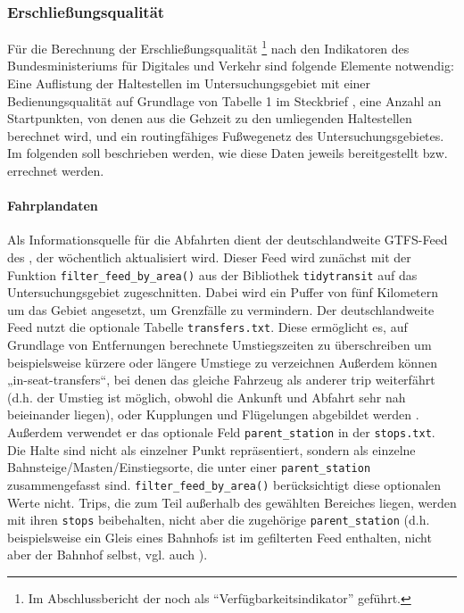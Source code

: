 \documentclass[11pt,a4paper]{scrartcl}
\begin{document}
    \subsubsection{Erschließungsqualität}
    Für die Berechnung der Erschließungsqualität \footnote{Im Abschlussbericht der \textcite{kcwgmbhMethodikUndEmpfehlungen2024} noch als \enquote{Verfügbarkeitsindikator} geführt.} nach den Indikatoren des Bundesministeriums für Digitales und Verkehr \parencite[25-27]{bmdvIndikatorenLeichtGemacht2025} sind folgende Elemente notwendig: Eine Auflistung der Haltestellen im Untersuchungsgebiet mit einer Bedienungsqualität auf Grundlage von Tabelle 1 im Steckbrief \parencite[27]{bmdvIndikatorenLeichtGemacht2025}, eine Anzahl an Startpunkten, von denen aus die Gehzeit zu den umliegenden Haltestellen berechnet wird, und ein routingfähiges Fußwegenetz des Untersuchungsgebietes. Im folgenden soll beschrieben werden, wie diese Daten jeweils bereitgestellt bzw. errechnet werden.
    \paragraph{Fahrplandaten}
        
    Als Informationsquelle für die Abfahrten dient der deutschlandweite GTFS-Feed des \textcite{delfie.v.DeutschlandweiteSollFahrplandatenGTFS2026}, der wöchentlich aktualisiert wird. Dieser Feed wird zunächst mit der Funktion \texttt{filter\_feed\_by\_area()} aus der Bibliothek  \texttt{tidytransit} \parencite{polettiTidytransitReadValidate2025} auf das Untersuchungsgebiet zugeschnitten.  Dabei wird ein Puffer von fünf Kilometern um das Gebiet angesetzt, um Grenzfälle zu vermindern. Der deutschlandweite Feed nutzt die optionale Tabelle \texttt{transfers.txt}. Diese ermöglicht es, auf Grundlage von Entfernungen berechnete Umstiegszeiten zu überschreiben um beispielsweise kürzere oder längere Umstiege zu verzeichnen Außerdem können „in-seat-transfers“, bei denen das gleiche Fahrzeug als anderer trip weiterfährt (d.h. der Umstieg ist möglich, obwohl die Ankunft und Abfahrt sehr nah beieinander liegen), oder Kupplungen und Flügelungen abgebildet werden \parencite{GoogleTransit2026}. Außerdem verwendet er das optionale Feld \texttt{parent\_station} in der \texttt{stops.txt}. Die Halte sind nicht als einzelner Punkt repräsentiert, sondern als einzelne Bahnsteige/Masten/Einstiegsorte, die unter einer \texttt{parent\_station} zusammengefasst sind. \texttt{filter\_feed\_by\_area()} berücksichtigt diese optionalen Werte nicht. Trips, die zum Teil außerhalb des gewählten Bereiches liegen, werden mit ihren \texttt{stops} beibehalten, nicht aber die zugehörige \texttt{parent\_station} (d.h. beispielsweise ein Gleis eines Bahnhofs ist im gefilterten Feed enthalten, nicht aber der Bahnhof selbst, vgl. auch \textcite[87]{kcwgmbhMethodikUndEmpfehlungen2024}).
        
\end{document}
